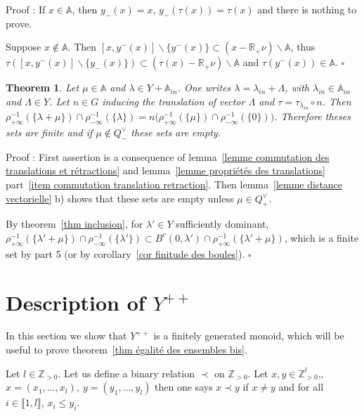 \documentclass[12pt]{article}
\theoremstyle{plain}
\newtheorem{thm}{Theorem}[section] %
\theoremstyle{definition}
\newcommand{\R}{\mathbb{R}}
\newcommand{\A}{\mathbb{A}}
\begin{document}
Proof : If $x\in \mathbb{A}$, then $y_-(x)=x$, $y_-(\tau(x))=\tau(x)$ and there is nothing to prove. 

Suppose $x\notin \mathbb{A}$. 
Then $[x,y^-(x)]\backslash \{y^-(x)\}\subset (x-\R_+\nu)\backslash \mathbb{A}$,
 thus $\tau([x,y^-(x)]\backslash\{y_-(x)\})\subset (\tau(x)-\R_+\nu)\backslash \mathbb{A}$ and $\tau(y^-(x))\in \mathbb{A}$. $\square$
 




\begin{thm}\label{thm invariance des cardinaux}
Let $\mu\in \A$ and $\lambda\in Y+\A_{in}$. One writes $\lambda=\lambda_{in}+\Lambda$, with $\lambda_{in}\in\A_{in}$ and $\Lambda\in Y$. Let $n\in G$ inducing the translation of vector $\Lambda$ and $\tau=\tau_{\lambda_{in}}\circ n$. Then $\rho_{+\infty}^{-1}(\{\lambda+\mu\})\cap\rho_{-\infty}^{-1}(\{\lambda\})=n\big(\rho_{+\infty}^{-1}(\{\mu\})\cap\rho_{-\infty}^{-1}(\{0\})\big)$. Therefore theses sets are finite and if $\mu\notin Q^\vee_-$ these sets are empty.

\end{thm}

Proof : First assertion is a consequence of lemma~\ref{lemme commutation des translations et rétractions} and lemma~\ref{lemme propriétés des translations} part~\ref{item commutation translation retraction}. Then lemma~\ref{lemme distance vectorielle} b) shows that these sets are empty unless $\mu\in Q^\vee_+$. 

By theorem~\ref{thm inclusion}, for $\lambda'\in Y$ sufficiently dominant, $\rho_{+\infty}^{-1}(\{\lambda'+\mu\})\cap\rho_{-\infty}^{-1}(\{\lambda'\})\subset B^v(0,\lambda')\cap \rho_{+\infty}^{-1}(\{\lambda'+\mu\})$, which is a finite set by \cite{gaussent2014spherical} part 5 (or by corollary~\ref{cor finitude des boules}). $\square$








\section{Description of $Y^{++}$}\label{sect Y^++}

In this section we show that $Y^{++}$ is a finitely generated monoid, which will be useful to prove theorem~\ref{thm égalité des ensembles bis}.



Let $l\in \mathbb{Z}_{>0}$. Let us define a binary relation $\prec$ on $\mathbb{Z}_{>0}$. Let $x,y\in \mathbb{Z}_{>0}^l$,, $x=(x_1,\ldots,x_l),\ y=(y_1,\ldots,y_l)$ then one says $x\prec y$ if $x\neq y$  and for all $i\in \llbracket 1,l\rrbracket$, $x_i\leq y_i$.
 
\end{document}
